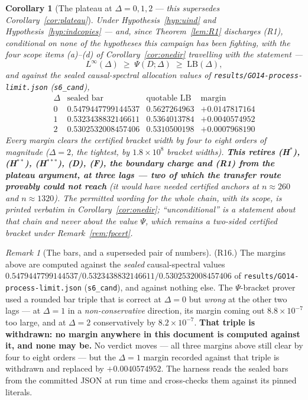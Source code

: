 \documentclass[11pt]{article}
\newtheorem{corollary}{Corollary}
\theoremstyle{definition}
\theoremstyle{remark}
\newtheorem{remark}{Remark}
\begin{document}
\begin{corollary}[The plateau at $\Delta=0,1,2$ ---
\emph{this supersedes Corollary~\ref{cor:plateau}}]
\label{cor:plateau2}
Under Hypothesis~\ref{hyp:uind} and Hypothesis~\ref{hyp:indcopies} ---
and, since Theorem~\ref{lem:R1} discharges (R1), \emph{conditional on
none} of the hypotheses this campaign has been fighting, with the four
scope items (a)--(d) of Corollary~\ref{cor:onedir} travelling with the
statement ---
\[
L^\infty(\Delta)\;\ge\;\Psi(D;\Delta)\;\ge\;\mathrm{LB}(\Delta),
\]
and against the \emph{sealed} causal-spectral allocation values of
\texttt{results/GO14-process-limit.json} (\texttt{s6\_cand}),
\[
\begin{array}{lccc}
\Delta & \text{sealed bar} & \text{quotable }\mathrm{LB}
  & \text{margin}\\[2pt]
0 & 0.5479447799144537 & 0.5627264963 & \mathbf{+0.0147817164}\\
1 & 0.5323438832146611 & 0.5364013784 & \mathbf{+0.0040574952}\\
2 & 0.5302532008457406 & 0.5310500198 & \mathbf{+0.0007968190}
\end{array}
\]
Every margin clears the certified bracket width by four to eight orders
of magnitude ($\Delta=2$, the tightest, by $1.8\times10^{8}$ bracket
widths). \textbf{This retires (H$^\ast$), (H$^{\ast\ast}$),
(H$^{\ast\ast\ast}$), (D), (F), the boundary charge \emph{and} (R1)
from the plateau argument, at three lags --- two of which the transfer
route provably could not reach} (it would have needed certified anchors
at $n\approx260$ and $n\approx1320$). The permitted wording for the
whole chain, with its scope, is printed verbatim in
Corollary~\ref{cor:onedir}; ``unconditional'' is a statement about that
chain and never about the value $\Psi$, which remains a two-sided
certified bracket under Remark~\ref{rem:fpcert}.
\end{corollary}

\begin{remark}[The bars, and a superseded pair of numbers]
\label{rem:R16}
(R16.) The margins above are computed against the \emph{sealed}
causal-spectral values
$0.5479447799144537/0.5323438832146611/0.5302532008457406$ of
\texttt{results/GO14-process-limit.json} (\texttt{s6\_cand}), and
against nothing else. The $\Psi$-bracket prover used a rounded bar
triple that is correct at $\Delta=0$ but \emph{wrong} at the other two
lags --- at $\Delta=1$ in a \emph{non-conservative} direction, its
margin coming out $8.8\times10^{-7}$ too large, and at $\Delta=2$
conservatively by $8.2\times10^{-7}$. \textbf{That triple is
withdrawn: no margin anywhere in this document is computed against it,
and none may be.} No verdict moves --- all three margins above still
clear by four to eight orders --- but the $\Delta=1$ margin recorded
against that triple is withdrawn and replaced by $+0.0040574952$. The
harness reads the sealed bars from the committed JSON at run time and
cross-checks them against its pinned literals.
\end{remark}
\end{document}
